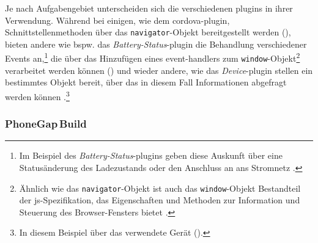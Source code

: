 {Je nach Aufgabengebiet unterscheiden sich die verschiedenen \glspl{plugin} in ihrer Verwendung.
Während bei einigen, wie \zB dem \gls{cordova}-\gls{plugin}, Schnittstellenmethoden über das \lstinline|navigator|-Objekt bereitgestellt werden (), bieten andere wie bspw. das \emph{Battery-Status}-\gls{plugin} die Behandlung verschiedener Events an,\footnote{Im Beispiel des \emph{Battery-Status}-\glspl{plugin} geben diese Auskunft über eine Statusänderung des Ladezustands oder den Anschluss an ans Stromnetz \cite{Cordova_Plugin_Registry_battery-status}.} die über das Hinzufügen eines \glspl{event-handler} zum \lstinline|window|-Objekt\footnote{Ähnlich wie das \lstinline|navigator|-Objekt ist auch das \lstinline|window|-Objekt Bestandteil der \gls{js}-Spezifikation, das Eigenschaften und Methoden zur Information und Steuerung des Browser-Fensters  bietet \cite{selfhtml_window}.} verarbeitet werden können () und wieder andere, wie \zB das \emph{Device}-\gls{plugin} stellen ein bestimmtes Objekt bereit, über das in diesem Fall Informationen abgefragt werden können \cite{Cordova_Plugin_Registry_Contacts, Cordova_Plugin_Registry_battery-status, Cordova_Plugin_Registry_device}.\footnote{In diesem Beispiel über das verwendete Gerät ().}




\subsubsection{PhoneGap\,Build}	%

}
